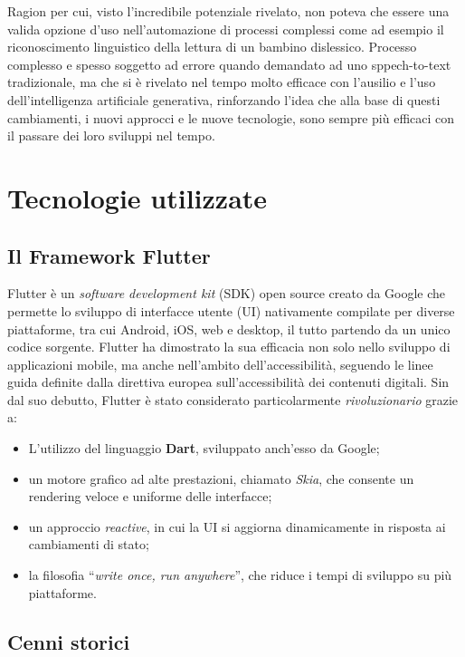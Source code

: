 \documentclass[14pt]{extbook}
\begin{document}
Ragion per cui, visto l'incredibile potenziale rivelato, non poteva che essere una valida opzione d'uso nell'automazione di processi complessi come ad esempio il riconoscimento linguistico della lettura di un bambino dislessico. Processo complesso e spesso soggetto ad errore quando demandato ad uno sppech-to-text tradizionale, ma che si è rivelato nel tempo molto efficace con l'ausilio e l'uso dell'intelligenza artificiale generativa, rinforzando l'idea che alla base di questi cambiamenti, i nuovi approcci e le nuove tecnologie, sono sempre più efficaci con il passare dei loro sviluppi nel tempo.\\
\pagebreak
\clearpage

\chapter{Tecnologie utilizzate}
\section{Il Framework Flutter}
Flutter è un \textit{software development kit} (SDK) open source creato da Google\cite{google2017flutter} che permette lo sviluppo di interfacce utente (UI) nativamente compilate per diverse piattaforme, tra cui Android, iOS, web e desktop, il tutto partendo da un unico codice sorgente. Flutter ha dimostrato la sua efficacia non solo nello sviluppo di applicazioni mobile, ma anche nell'ambito dell'accessibilità, seguendo le linee guida definite dalla direttiva europea \cite{eu2016_2102} sull'accessibilità dei contenuti digitali. Sin dal suo debutto, Flutter è stato considerato particolarmente \emph{rivoluzionario} grazie a:
\begin{itemize}
    \item L'utilizzo del linguaggio \textbf{Dart}, sviluppato anch'esso da Google;
    \item un motore grafico ad alte prestazioni, chiamato \emph{Skia}, che consente un rendering veloce e uniforme delle interfacce;
    \item un approccio \emph{reactive}, in cui la UI si aggiorna dinamicamente in risposta ai cambiamenti di stato;
    \item la filosofia ``\emph{write once, run anywhere}'', che riduce i tempi di sviluppo su più piattaforme.
\end{itemize}

\section{Cenni storici}
\end{document}
